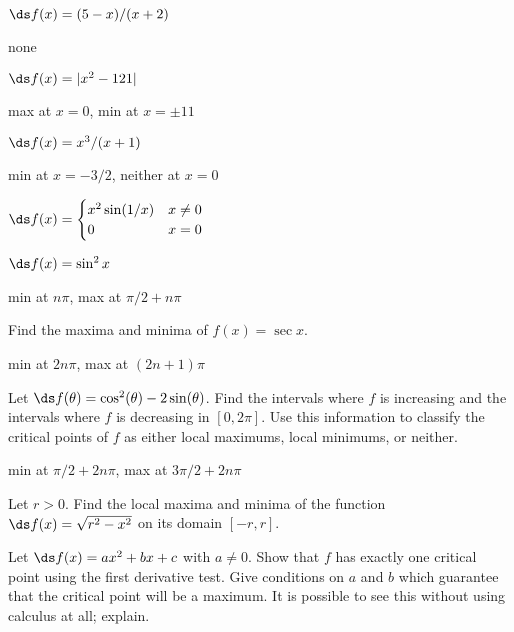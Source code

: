 \begin{exercises}
\begin{exercise}
$\ds f(x) = (5-x)/(x+2)$
\begin{answer} none
\end{answer}\end{exercise}

\begin{exercise} $\ds f(x) = |x^2 - 121|$
\begin{answer} max at $x=0$, min at $x=\pm 11$
\end{answer}\end{exercise}

\begin{exercise} $\ds f(x) = x^3/(x+1)$
\begin{answer} min at $x=-3/2$, neither at $x=0$
\end{answer}\end{exercise}

\begin{exercise} $\ds f(x)= \begin{cases}
x^2 \sin(1/x)  & x\neq 0  \\
 0  & x=0 \end{cases}$
\end{exercise}

\begin{exercise} $\ds f(x) = \sin ^2 x$
\begin{answer} min at $n\pi$, max at $\pi/2+n\pi$
\end{answer}\end{exercise}

\endtwocol
\bsk
\begin{exercise} Find the maxima and minima of $f(x)=\sec x$.
\begin{answer} min at $2n\pi$, max at $(2n+1)\pi$
\end{answer}\end{exercise}

\begin{exercise}  Let $\ds f(\theta) = \cos^2(\theta) -
 2\sin(\theta)$.  Find the intervals where $f$ is increasing and the
 intervals where $f$ is decreasing in $[0,2\pi]$.  Use this
 information to classify the critical points of $f$ as either local
 maximums, local minimums, or neither.
\begin{answer} min at $\pi/2+2n\pi$, max at $3\pi/2+2n\pi$
\end{answer}\end{exercise}

\begin{exercise} Let $r>0$. Find the local
maxima and minima of the function $\ds f(x)
=\sqrt{r^2 -x^2 }$ on its domain $[-r,r]$.
\end{exercise}

\begin{exercise} Let $\ds f(x) =a x^2 + bx + c$ with $a\neq 0$. Show that $f$
has exactly one critical point using the first derivative test. Give
conditions on $a$ and $b$ which guarantee that the critical point will
be a maximum. It is possible to see this without using calculus at
all; explain.
\end{exercise}

\end{exercises}

